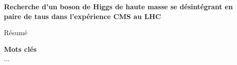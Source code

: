\begin{center}
\LARGE
\bf
\sffamily
Recherche d'un boson de Higgs de haute masse se désintégrant en paire de taus dans l'expérience CMS au LHC
\end{center}
\bigskip

Résumé

\vfill

\textbf{\Large Mots clés}\\
...

\vfill